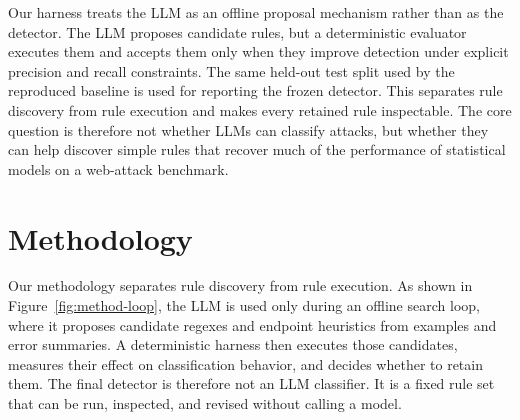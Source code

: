 \documentclass[letterpaper,twocolumn,10pt]{article}
\begin{document}
Our harness treats the LLM as an offline proposal mechanism rather than as the detector. The LLM proposes candidate rules, but a deterministic evaluator executes them and accepts them only when they improve detection under explicit precision and recall constraints. The same held-out test split used by the reproduced baseline is used for reporting the frozen detector. This separates rule discovery from rule execution and makes every retained rule inspectable. The core question is therefore not whether LLMs can classify attacks, but whether they can help discover simple rules that recover much of the performance of statistical models on a web-attack benchmark.

\section{Methodology}

Our methodology separates rule discovery from rule execution. As shown in Figure~\ref{fig:method-loop}, the LLM is used only during an offline search loop, where it proposes candidate regexes and endpoint heuristics from examples and error summaries. A deterministic harness then executes those candidates, measures their effect on classification behavior, and decides whether to retain them. The final detector is therefore not an LLM classifier. It is a fixed rule set that can be run, inspected, and revised without calling a model.
\end{document}
